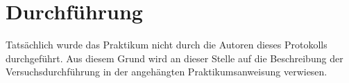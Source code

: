 \section{Durchführung}
\label{sec:durchfuerung}
Tatsächlich wurde das Praktikum nicht durch die Autoren dieses Protokolls durchgeführt. Aus diesem Grund wird an dieser Stelle auf die Beschreibung der Versuchsdurchführung in der angehängten Praktikumsanweisung verwiesen.

\newpage
